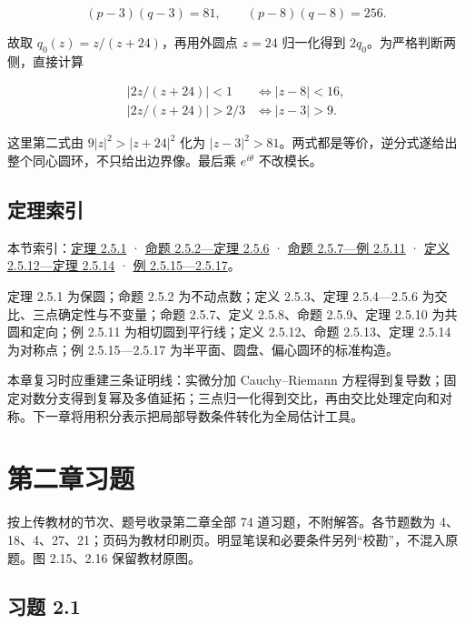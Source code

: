 \documentclass[11pt,a4paper]{article}
\begin{document}
\[
(p-3)(q-3)=81,\qquad(p-8)(q-8)=256.
\]

故取 \(q_0(z)=z/(z+24)\)，再用外圆点 \(z=24\) 归一化得到
\(2q_0\)。为严格判断两侧，直接计算

\[
\begin{aligned}
|2z/(z+24)|<1&\iff |z-8|<16,\\
|2z/(z+24)|>2/3&\iff |z-3|>9.
\end{aligned}
\]

这里第二式由 \(9|z|^2>|z+24|^2\) 化为
\(|z-3|^2>81\)。两式都是等价，逆分式遂给出整个同心圆环，不只给出边界像。最后乘
\(e^{i\theta}\) 不改模长。

\subsection{定理索引}\label{ch02-s5-ux5b9aux7406ux7d22ux5f15}

本节索引：\hyperref[ch02-s5-ux4fddux5706ux6027]{定理 2.5.1} ·
\hyperref[ch02-s5-ux4ea4ux6bd4ux4e0eux4e09ux70b9ux6784ux9020]{命题 2.5.2---定理
2.5.6} · \hyperref[ch02-s5-ux5b9aux5411ux4e0eux8fb9ux754cux4e24ux4fa7]{命题
2.5.7---例 2.5.11} · \hyperref[ch02-s5-ux5bf9ux79f0ux70b9]{定义 2.5.12---定理
2.5.14} · \hyperref[ch02-s5-ux4e09ux4e2aux57faux672cux6784ux9020]{例
2.5.15---2.5.17}。

定理 2.5.1 为保圆；命题 2.5.2 为不动点数；定义 2.5.3、定理 2.5.4---2.5.6
为交比、三点确定性与不变量；命题 2.5.7、定义 2.5.8、命题 2.5.9、定理
2.5.10 为共圆和定向；例 2.5.11 为相切圆到平行线；定义 2.5.12、命题
2.5.13、定理 2.5.14 为对称点；例 2.5.15---2.5.17
为半平面、圆盘、偏心圆环的标准构造。

本章复习时应重建三条证明线：实微分加 Cauchy--Riemann
方程得到复导数；固定对数分支得到复幂及多值延拓；三点归一化得到交比，再由交比处理定向和对称。下一章将用积分表示把局部导数条件转化为全局估计工具。

\clearpage\section*{第二章习题}
按上传教材的节次、题号收录第二章全部 74 道习题，不附解答。各节题数为
4、18、4、27、21；页码为教材印刷页。明显笔误和必要条件另列``校勘''，不混入原题。图
2.15、2.16 保留教材原图。

\subsection{习题 2.1}\label{ch02-practice-ux4e60ux9898-2.1}
\end{document}
